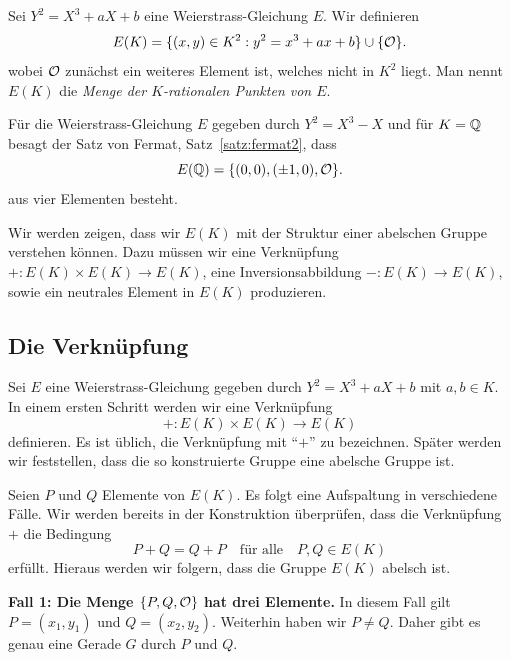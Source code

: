 \begin{definition}
  Sei $Y^2 = X^3+aX+b$ eine Weierstrass-Gleichung $E$.
  Wir definieren 
  \begin{equation*}
    E(K) = \{(x,y) \in K^2 : y^2 = x^3 + ax+b\} \cup \{{\mathcal O}\}.
  \end{equation*}
  wobei ${\mathcal O}$ zunächst ein weiteres Element ist, welches nicht in
  $K^2$ liegt. Man nennt $E(K)$ die \emph{Menge der $K$-rationalen Punkten
  von $E$}. 
\end{definition}

\begin{beispiel}
  \label{bsp:fermat}
  Für die Weierstrass-Gleichung $E$ gegeben durch $Y^2 = X^3-X$ und
  für $K={\mathbb{Q}}$ besagt der 
  Satz von Fermat, Satz~\ref{satz:fermat2}, dass
  $$ E({\mathbb{Q}}) = \{(0,0), (\pm 1,0), {\mathcal O}\} .$$
  aus vier Elementen besteht. 
\end{beispiel}

Wir werden zeigen, dass wir $E(K)$ mit der Struktur einer abelschen
Gruppe verstehen können.
Dazu müssen wir eine Verknüpfung $+\colon E(K)\times
E(K)\rightarrow E(K)$, eine Inversionsabbildung
$-\colon E(K)\rightarrow E(K)$, sowie ein neutrales Element in $E(K)$
produzieren.



\subsection{Die Verknüpfung}
\label{sec:verknuepfung}

Sei $E$ eine Weierstrass-Gleichung gegeben durch $Y^2 = X^3+aX+b$ mit
$a,b\in K$. 
In einem ersten Schritt werden wir eine Verknüpfung
\begin{equation*}
  + \colon E(K)\times E(K) \rightarrow E(K)
\end{equation*}
definieren. Es ist üblich, die Verknüpfung mit ``$+$'' zu bezeichnen.
Später werden wir feststellen, dass die so konstruierte Gruppe eine
abelsche Gruppe ist. 

Seien $P$ und $Q$ Elemente von $E(K)$. Es folgt eine Aufspaltung in
verschiedene Fälle. Wir werden bereits in der Konstruktion
überprüfen, dass die Verknüpfung $+$ die Bedingung
$$
P+Q=Q+P\quad\text{für alle}\quad P,Q\in E(K) 
$$
erfüllt. Hieraus werden wir folgern, dass die Gruppe $E(K)$ abelsch
ist.  

\medskip
\textbf{Fall 1: Die Menge $\{P,Q,{\mathcal O}\}$ hat drei Elemente.} In diesem
Fall gilt $P = (x_1,y_1)$ und $Q = (x_2,y_2)$. Weiterhin haben wir
$P\not=Q$.
Daher gibt es genau eine Gerade $G$ durch $P$ und $Q$.

